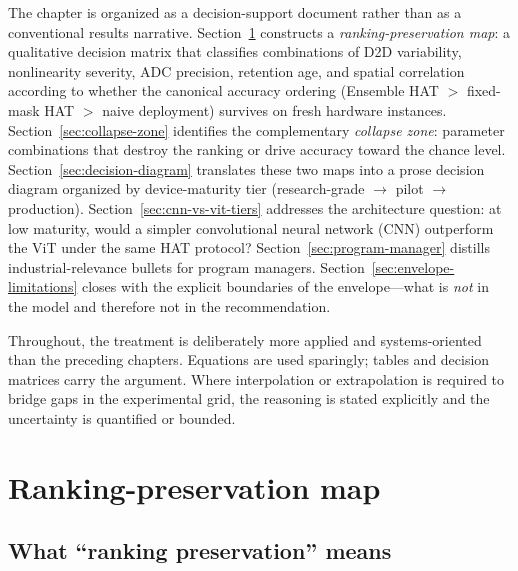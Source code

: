 The chapter is organized as a decision-support document rather than as a conventional results narrative.  Section~\ref{sec:ranking-preservation} constructs a \emph{ranking-preservation map}: a qualitative decision matrix that classifies combinations of D2D variability, nonlinearity severity, ADC precision, retention age, and spatial correlation according to whether the canonical accuracy ordering (Ensemble HAT $>$ fixed-mask HAT $>$ naive deployment) survives on fresh hardware instances.  Section~\ref{sec:collapse-zone} identifies the complementary \emph{collapse zone}: parameter combinations that destroy the ranking or drive accuracy toward the chance level.  Section~\ref{sec:decision-diagram} translates these two maps into a prose decision diagram organized by device-maturity tier (research-grade $\rightarrow$ pilot $\rightarrow$ production).  Section~\ref{sec:cnn-vs-vit-tiers} addresses the architecture question: at low maturity, would a simpler convolutional neural network (CNN) outperform the ViT under the same HAT protocol?  Section~\ref{sec:program-manager} distills industrial-relevance bullets for program managers.  Section~\ref{sec:envelope-limitations} closes with the explicit boundaries of the envelope---what is \emph{not} in the model and therefore not in the recommendation.

Throughout, the treatment is deliberately more applied and systems-oriented than the preceding chapters.  Equations are used sparingly; tables and decision matrices carry the argument.  Where interpolation or extrapolation is required to bridge gaps in the experimental grid, the reasoning is stated explicitly and the uncertainty is quantified or bounded.


\section{Ranking-preservation map}
\label{sec:ranking-preservation}

\subsection{What ``ranking preservation'' means}

